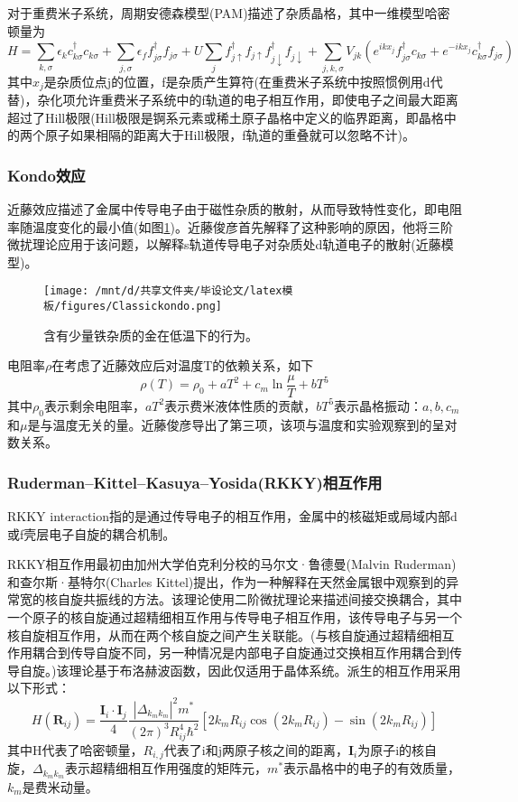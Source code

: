 对于重费米子系统，周期安德森模型(PAM)描述了杂质晶格，其中一维模型哈密顿量为
$$
H=\sum_{k, \sigma} \epsilon_{k} c_{k \sigma}^{\dagger} c_{k \sigma}+\sum_{j, \sigma} \epsilon_{f} f_{j \sigma}^{\dagger} f_{j \sigma}+U \sum_{j} f_{j \uparrow}^{\dagger} f_{j \uparrow} f_{j \downarrow}^{\dagger} f_{j \downarrow}+\sum_{j, k, \sigma} V_{j k}\left(e^{i k x_{j}} f_{j \sigma}^{\dagger} c_{k \sigma}+e^{-i k x_{j}} c_{k \sigma}^{\dagger} f_{j \sigma}\right)
$$
其中$x_j$是杂质位点j的位置，f是杂质产生算符(在重费米子系统中按照惯例用d代替)，杂化项允许重费米子系统中的f轨道的电子相互作用，即使电子之间最大距离超过了Hill极限(Hill极限是锕系元素或稀土原子晶格中定义的临界距离，即晶格中的两个原子如果相隔的距离大于Hill极限，f轨道的重叠就可以忽略不计)。%

\subsubsection{Kondo效应}
近藤效应描述了金属中传导电子由于磁性杂质的散射，从而导致特性变化，即电阻率随温度变化的最小值(如图\ref{fig})。近藤俊彦首先解释了这种影响的原因\cite{3}，他将三阶微扰理论应用于该问题，以解释s轨道传导电子对杂质处d轨道电子的散射(近藤模型)。
\begin{figure}[h]
    \centering
    \texttt{[image: /mnt/d/共享文件夹/毕设论文/latex模板/figures/Classickondo.png]}
    \caption{含有少量铁杂质的金在低温下的行为\cite{4}。}
    \label{fig}
\end{figure}
电阻率$\rho$在考虑了近藤效应后对温度T的依赖关系，如下
$$
\rho(T)=\rho_{0}+a T^{2}+c_{m} \ln \frac{\mu}{T}+b T^{5}
$$
其中$\rho_0$表示剩余电阻率，$aT^2$表示费米液体性质的贡献，$bT^5$表示晶格振动：$a,b,c_m$和$\mu$是与温度无关的量。近藤俊彦导出了第三项，该项与温度和实验观察到的呈对数关系。


\subsubsection{Ruderman–Kittel–Kasuya–Yosida(RKKY)相互作用}
RKKY interaction指的是通过传导电子的相互作用，金属中的核磁矩或局域内部d或f壳层电子自旋的耦合机制\cite{5}\cite{6}\cite{7}。

RKKY相互作用最初由加州大学伯克利分校的马尔文·鲁德曼(Malvin Ruderman)和查尔斯·基特尔(Charles Kittel)提出，作为一种解释在天然金属银中观察到的异常宽的核自旋共振线的方法。该理论使用二阶微扰理论来描述间接交换耦合，其中一个原子的核自旋通过超精细相互作用与传导电子相互作用，该传导电子与另一个核自旋相互作用，从而在两个核自旋之间产生关联能。(与核自旋通过超精细相互作用耦合到传导自旋不同，另一种情况是内部电子自旋通过交换相互作用耦合到传导自旋。)该理论基于布洛赫波函数，因此仅适用于晶体系统。派生的相互作用采用以下形式：
$$
H\left(\mathbf{R}_{i j}\right)=\frac{\mathbf{I}_{i} \cdot \mathbf{I}_{j}}{4} \frac{\left|\Delta_{k_{m} k_{m}}\right|^{2} m^{*}}{(2 \pi)^{3} R_{i j}^{4} \hbar^2}\left[2 k_{m} R_{i j} \cos \left(2 k_{m} R_{i j}\right)-\sin \left(2 k_{m} R_{i j}\right)\right]
$$
其中H代表了哈密顿量，$R_{i,j}$代表了i和j两原子核之间的距离，$\mathbf{I}_i$为原子i的核自旋，$\Delta_{k_{m}k_m}$表示超精细相互作用强度的矩阵元，$m^*$表示晶格中的电子的有效质量，$k_m$是费米动量。 







